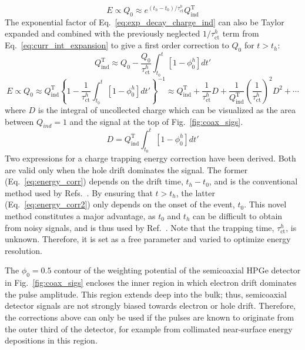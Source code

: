\begin{equation}
	E \propto Q_0 \approx e^{(t_h-t_0)/\tau^h_\text{ct}}Q^\text{T}_\text{ind}
	\label{eq:energy_corr}
\end{equation}
The exponential factor of Eq.~\ref{eq:exp_decay_charge_ind} can also be Taylor expanded and combined with the previously neglected $1/\tau^h_\text{ct}$ term from Eq.~\ref{eq:curr_int_expansion} to give a first order correction to $Q_0$ for $t > t_h$:
\begin{equation}
	Q^\text{T}_\text{ind} \approx Q_0 - \frac{Q_0}{\tau^h_\text{ct}}\int_{t_0}^{t}\left[1-\phi^h_0\right]dt'
	\label{eq:charge_ind_corr2}
\end{equation}
\begin{equation}
	E \propto Q_0 \approx Q^\text{T}_\text{ind}\left\{1 - \frac{1}{\tau^h_\text{ct}}\int_{t_0}^{t}\left[1-\phi^h_0\right]dt'\right\}^{-1} \approx Q^\text{T}_\text{ind} + \frac{1}{\tau^h_\text{ct}}D + \frac{1}{Q^\text{T}_\text{ind}}\left(\frac{1}{\tau^h_\text{ct}}\right)^2D^2 + \cdots 
	\label{eq:energy_corr2}
\end{equation}
where $D$ is the integral of uncollected charge which can be visualized as the area between $Q_{ind} = 1$ and the signal at the top of Fig.~\ref{fig:coax_sigs}. 
\begin{equation}
	D = Q^\text{T}_\text{ind}\int_{t_0}^{t}\left[1-\phi^h_0\right]dt'
	\label{eq:uncollected_charge}
\end{equation}
Two expressions for a charge trapping energy correction have been derived. Both are valid only when the hole drift dominates the signal. The former (Eq.~\ref{eq:energy_corr}) depends on the drift time, $t_h-t_0$, and is the conventional method used by Refs.~\cite{ppc_charge_trapping1,ppc_charge_trapping2}. By ensuring that $t > t_h$, the latter (Eq.~\ref{eq:energy_corr2}) only depends on the onset of the event, $t_0$. This novel method constitutes a major advantage, as $t_0$ and $t_h$ can be difficult to obtain from noisy signals, and is thus used by Ref.~\cite{mjd_charge_trapping}. Note that the trapping time, $\tau^h_\text{ct}$, is unknown. Therefore, it is set as a free parameter and varied to optimize energy resolution. 

The $\phi_0 = 0.5$ contour of the weighting potential of the semicoaxial HPGe detector in Fig.~\ref{fig:coax_sigs} encloses the inner region in which electron drift dominates the pulse amplitude. This region extends deep into the bulk; thus, semicoaxial detector signals are not strongly biased towards electron or hole drift. Therefore, the corrections above can only be used if the pulses are known to originate from the outer third of the detector, for example from collimated near-surface energy depositions in this region. 

